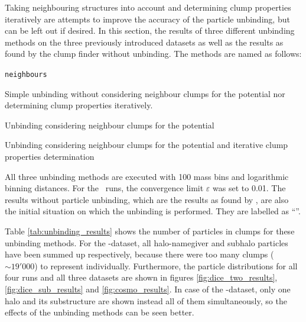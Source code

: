 Taking neighbouring structures into account and determining clump properties iteratively are attempts to improve the accuracy of the particle unbinding, but can be left out if desired.
In this section, the results of three different unbinding methods on the three previously introduced datasets as well as the results as found by the clump finder without unbinding.
The methods are named as follows:
%
\begin{labeling}{\texttt{neighbours}}
	\renewcommand{\arraystretch}{0.1}
 	\item [\simple]		Simple unbinding without considering neighbour clumps for the potential nor determining clump properties iteratively.
	\item [\neigh]		Unbinding considering neighbour clumps for the potential
	\item [\iter]		Unbinding considering neighbour clumps for the potential and iterative clump properties determination
\end{labeling}

%
All three unbinding methods are executed with 100 mass bins and logarithmic binning distances.
For the \iter\ runs, the convergence limit $\varepsilon$ was set to 0.01.
The results without particle unbinding, which are the results as found by \phew, are also the initial situation on which the unbinding is performed.
They are labelled as ``\phewon''.

Table \ref{tab:unbinding_results} shows the number of particles in clumps for these unbinding methods.
For the \cosmo-dataset, all halo-namegiver and subhalo particles have been summed up respectively, because there were too many clumps ($\sim 19'000$) to represent individually.
Furthermore, the particle distributions for all four runs and all three datasets are shown in figures \ref{fig:dice_two_results}, \ref{fig:dice_sub_results} and \ref{fig:cosmo_results}.
In case of the \cosmo-dataset, only one halo and its substructure are shown instead all of them simultaneously, so the effects of the unbinding methods can be seen better.

